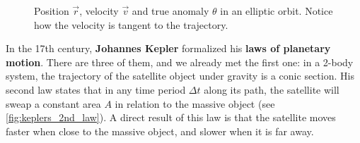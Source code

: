 \begin{figure}
	\begin{center}
	\end{center}
	\caption{Position $\vec{r}$, velocity $\vec{v}$ and true anomaly $\theta$ in an elliptic orbit. Notice how the velocity is tangent to the trajectory.}
	\label{fig:magnitudes_elliptical_orbit}
\end{figure}


In the 17th century, \textbf{Johannes Kepler} formalized his \textbf{laws of planetary motion}. There are three of them, and we already met the first one: in a 2-body system, the trajectory of the satellite object under gravity is a conic section. His second law states that in any time period $\Delta t$ along its path, the satellite will sweap a constant area $A$ in relation to the massive object (see \autoref{fig:keplers_2nd_law}). A direct result of this law is that the satellite moves faster when close to the massive object, and slower when it is far away.

